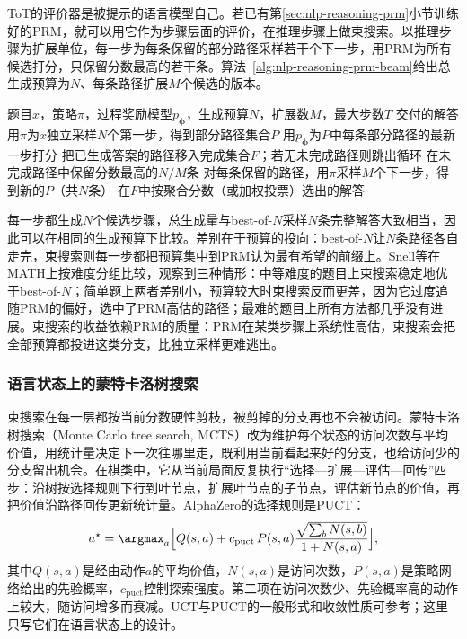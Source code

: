 ToT的评价器是被提示的语言模型自己。若已有第\ref{sec:nlp-reasoning-prm}小节训练好的PRM，就可以用它作为步骤层面的评价，在推理步骤上做束搜索。以推理步骤为扩展单位，每一步为每条保留的部分路径采样若干个下一步，用PRM为所有候选打分，只保留分数最高的若干条。算法~\ref{alg:nlp-reasoning-prm-beam}给出总生成预算为$N$、每条路径扩展$M$个候选的版本。

\begin{algorithm}[过程奖励引导的步骤束搜索]
  \label{alg:nlp-reasoning-prm-beam}
  \begin{algorithmic}[1]
    \Require 题目$x$，策略$\pi$，过程奖励模型$p_{\bm\phi}$，生成预算$N$，扩展数$M$，最大步数$T$
    \Ensure 交付的解答
    \State 用$\pi$为$x$独立采样$N$个第一步，得到部分路径集合$P$
      \State 用$p_{\bm\phi}$为$P$中每条部分路径的最新一步打分
      \State 把已生成答案的路径移入完成集合$F$；若无未完成路径则跳出循环
      \State 在未完成路径中保留分数最高的$N/M$条
      \State 对每条保留的路径，用$\pi$采样$M$个下一步，得到新的$P$（共$N$条）
    \EndFor
    \State \Return 在$F$中按聚合分数（或加权投票）选出的解答
  \end{algorithmic}
\end{algorithm}

每一步都生成$N$个候选步骤，总生成量与best-of-$N$采样$N$条完整解答大致相当，因此可以在相同的生成预算下比较。差别在于预算的投向：best-of-$N$让$N$条路径各自走完，束搜索则每一步都把预算集中到PRM认为最有希望的前缀上。Snell等在MATH上按难度分组比较，观察到三种情形：中等难度的题目上束搜索稳定地优于best-of-$N$；简单题上两者差别小，预算较大时束搜索反而更差，因为它过度追随PRM的偏好，选中了PRM高估的路径；最难的题目上所有方法都几乎没有进展。束搜索的收益依赖PRM的质量：PRM在某类步骤上系统性高估，束搜索会把全部预算都投进这类分支，比独立采样更难逃出。

\subsubsection{语言状态上的蒙特卡洛树搜索}
\label{sec:nlp-reasoning-mcts}

束搜索在每一层都按当前分数硬性剪枝，被剪掉的分支再也不会被访问。蒙特卡洛树搜索（Monte Carlo tree search, MCTS）改为维护每个状态的访问次数与平均价值，用统计量决定下一次往哪里走，既利用当前看起来好的分支，也给访问少的分支留出机会。在棋类中，它从当前局面反复执行“选择—扩展—评估—回传”四步：沿树按选择规则下行到叶节点，扩展叶节点的子节点，评估新节点的价值，再把价值沿路径回传更新统计量。AlphaZero的选择规则是PUCT：
\begin{equation}
  a^\star=\argmax_{a}\Bigl[Q(s,a)+c_{\mathrm{puct}}\,P(s,a)\frac{\sqrt{\sum_bN(s,b)}}{1+N(s,a)}\Bigr],
  \label{eq:nlp-reasoning-puct}
\end{equation}
其中$Q(s,a)$是经由动作$a$的平均价值，$N(s,a)$是访问次数，$P(s,a)$是策略网络给出的先验概率，$c_{\mathrm{puct}}$控制探索强度。第二项在访问次数少、先验概率高的动作上较大，随访问增多而衰减。UCT与PUCT的一般形式和收敛性质可参考；这里只写它们在语言状态上的设计。

